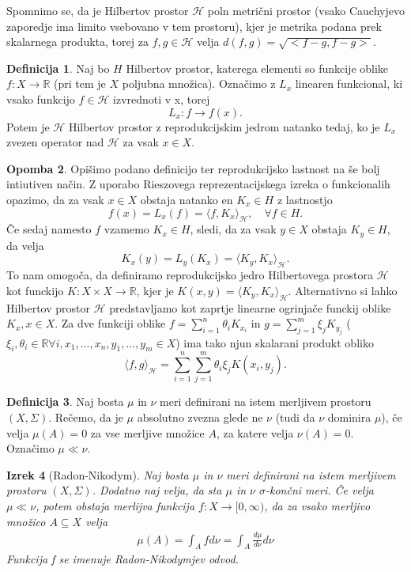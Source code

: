 \documentclass[12pt,a4paper]{amsart}
\theoremstyle{definition} %
\newtheorem{definicija}{Definicija}[section]
\newtheorem{opomba}[definicija]{Opomba}
\theoremstyle{plain} %
\newtheorem{izrek}[definicija]{Izrek}
\begin{document}
Spomnimo se, da je Hilbertov prostor $\mathcal{H}$ poln metrični prostor (vsako Cauchyjevo zaporedje ima limito vsebovano v tem prostoru), kjer je metrika podana prek skalarnega produkta, torej za $f,g \in \mathcal{H}$ velja $d(f,g) = \sqrt{<f-g,f-g>}$.
\begin{definicija}
Naj bo $H$ Hilbertov prostor, katerega elementi so funkcije oblike $f: X \rightarrow \mathbb{R}$ (pri tem je $X$ poljubna množica). Označimo z $L_x$ linearen funkcional, ki vsako funkcijo $f \in \mathcal{H}$ izvrednoti v x, torej $$L_x : f \rightarrow f(x).$$ Potem je $\mathcal{H}$ Hilbertov prostor z reprodukcijskim jedrom natanko tedaj, ko je $L_x$ zvezen operator nad $\mathcal{H}$ za vsak $x \in X$. 
\end{definicija}
\begin{opomba}
Opišimo podano definicijo ter reprodukcijsko lastnost na še bolj intiutiven način. Z uporabo Rieszovega reprezentacijskega izreka o funkcionalih opazimo, da za vsak $x \in X$ obstaja natanko en $K_x \in H$ z lastnostjo
$$
f(x) = L_x(f) = \langle f, K_x \rangle_{\mathcal{H}}, \quad \forall f \in H.
$$
Če sedaj namesto $f$ vzamemo $K_x \in H$, sledi, da za vsak $y \in X$ obstaja $K_y \in H$, da velja
$$
K_x(y) = L_y(K_x) = \langle K_y, K_x \rangle_{\mathcal{H}}.
$$
To nam omogoča, da definiramo reprodukcijsko jedro Hilbertovega prostora $\mathcal{H}$ kot funckijo $K: X \times X \rightarrow \mathbb{R}$, kjer je $K(x,y)=\langle K_y, K_x \rangle_{\mathcal{H}}.$
\newline
\newline
Alternativno si lahko Hilbertov prostor $\mathcal{H}$ predstavljamo kot zaprtje linearne ogrinjače funckij oblike $K_x, x \in X$. Za dve funkciji oblike $f = \sum_{i=1}^{n}\theta_i K_{x_i}$ in $ g = \sum_{j=1}^{m}\xi_j K_{y_j}$ ($\xi_i, \theta_i \in \mathbb{R} \forall i, x_1,...,x_n,y_1,...,y_m \in X$) ima tako njun skalarani produkt obliko
$$
\langle f, g\rangle_{\mathcal{H}} = \sum_{i=1}^{n}\sum_{j=1}^{m}\theta_i \xi_j K(x_i,y_j).
$$
\end{opomba}
\begin{definicija} 
Naj bosta $\mu$ in $\nu$ meri definirani na istem merljivem prostoru $(X, \Sigma)$. Rečemo, da je $\mu$ absolutno zvezna glede ne $\nu$ (tudi da $\nu$ dominira $\mu$), če velja $\mu(A) = 0$ za vse merljive množice $A$, za katere velja $\nu(A)=0$. Označimo $\mu \ll \nu$.
\end{definicija}

\begin{izrek} [Radon-Nikodym]
Naj bosta $\mu$ in $\nu$ meri definirani na istem merljivem prostoru $(X, \Sigma)$. Dodatno naj velja, da sta $\mu$ in $\nu$ $\sigma$-končni meri. Če velja  $\mu \ll \nu$, potem obstaja merlijva funkcija $f : X \rightarrow [0,\infty)$, da za vsako merljivo množico $A \subseteq X$ velja
\begin{gather*}
\mu(A) = \int_A f d \nu = \int_A \frac{d \mu}{d \nu} d \nu
\end{gather*}
Funkcija f se imenuje Radon-Nikodymjev odvod.
\end{izrek}
\end{document}
